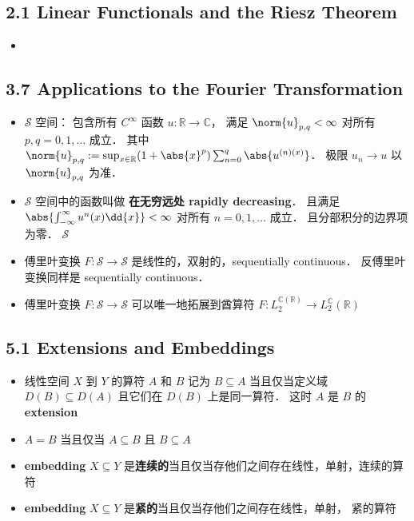 \subsection{2.1 Linear Functionals and the Riesz Theorem}
\begin{itemize}
\item 
\end{itemize}

\subsection{3.7 Applications to the Fourier Transformation}
\begin{itemize}
\item $\mathcal S$ 空间： 包含所有 $C^\infty$ 函数 $u: \mathbb R \to \mathbb C$， 满足 $\norm{u}_{p,q} < \infty$ 对所有 $p, q=0,1,\dots$ 成立． 其中 $\norm{u}_{p,q} := \sup_{x\in\mathbb R} (1+\abs{x}^p) \sum_{n=0}^q\abs{u^{(n)(x)}}$． 极限 $u_n \to u$ 以 $\norm{u}_{p,q}$ 为准．

\item $\mathcal S$ 空间中的函数叫做 \textbf{在无穷远处 rapidly decreasing}． 且满足 $\abs{\int_{-\infty}^\infty u^{n}(x) \dd{x}} < \infty$ 对所有 $n = 0, 1,\dots$ 成立． 且分部积分的边界项为零． $\mathcal S$ 

\item 傅里叶变换 $F:\mathcal S\to\mathcal S$ 是线性的，双射的，sequentially continuous． 反傅里叶变换同样是 sequentially continuous．

\item 傅里叶变换 $F:\mathcal S\to\mathcal S$ 可以唯一地拓展到酋算符 $F: L_2^{\mathbb C(\mathbb R)} \to L_2^{\mathbb C}(\mathbb R)$
\end{itemize}

\subsection{5.1 Extensions and Embeddings}
\begin{itemize}
\item 线性空间 $X$ 到 $Y$ 的算符 $A$ 和 $B$ 记为 $B \subseteq A$ 当且仅当定义域 $D(B) \subseteq D(A)$ 且它们在 $D(B)$ 上是同一算符． 这时 $A$ 是 $B$ 的 \textbf{extension}

\item $A = B$ 当且仅当 $A\subseteq B$ 且 $B\subseteq A$

\item \textbf{embedding} $X \subseteq Y$ 是\textbf{连续的}当且仅当存他们之间存在线性，单射，连续的算符

\item \textbf{embedding} $X \subseteq Y$ 是\textbf{紧的}当且仅当存他们之间存在线性，单射， 紧的算符
\end{itemize}


